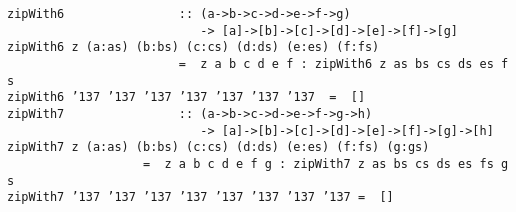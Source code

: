 %
\eprogB\noindent\bprogB
\mbox{\tt zipWith6\ \ \ \ \ \ \ \ \ \ \ \ \ \ \ \ ::\ (a->b->c->d->e->f->g)}\\
\mbox{\tt \ \ \ \ \ \ \ \ \ \ \ \ \ \ \ \ \ \ \ \ \ \ \ \ \ \ \ ->\ [a]->[b]->[c]->[d]->[e]->[f]->[g]}\\
\mbox{\tt zipWith6\ z\ (a:as)\ (b:bs)\ (c:cs)\ (d:ds)\ (e:es)\ (f:fs)}\\
\mbox{\tt \ \ \ \ \ \ \ \ \ \ \ \ \ \ \ \ \ \ \ \ \ \ \ \ =\ \ z\ a\ b\ c\ d\ e\ f\ :\ zipWith6\ z\ as\ bs\ cs\ ds\ es\ fs}\\
\mbox{\tt zipWith6\ {\char'137}\ {\char'137}\ {\char'137}\ {\char'137}\ {\char'137}\ {\char'137}\ {\char'137}\ \ =\ \ []}
%
\eprogB\noindent\bprogB
\mbox{\tt zipWith7\ \ \ \ \ \ \ \ \ \ \ \ \ \ \ \ ::\ (a->b->c->d->e->f->g->h)}\\
\mbox{\tt \ \ \ \ \ \ \ \ \ \ \ \ \ \ \ \ \ \ \ \ \ \ \ \ \ \ \ ->\ [a]->[b]->[c]->[d]->[e]->[f]->[g]->[h]}\\
\mbox{\tt zipWith7\ z\ (a:as)\ (b:bs)\ (c:cs)\ (d:ds)\ (e:es)\ (f:fs)\ (g:gs)}\\
\mbox{\tt \ \ \ \ \ \ \ \ \ \ \ \ \ \ \ \ \ \ \ =\ \ z\ a\ b\ c\ d\ e\ f\ g\ :\ zipWith7\ z\ as\ bs\ cs\ ds\ es\ fs\ gs}\\
\mbox{\tt zipWith7\ {\char'137}\ {\char'137}\ {\char'137}\ {\char'137}\ {\char'137}\ {\char'137}\ {\char'137}\ {\char'137}\ =\ \ []}
%
\eprogB
